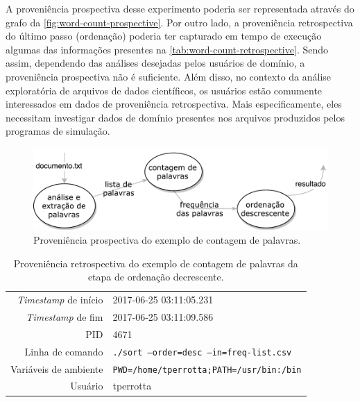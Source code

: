 A proveniência prospectiva desse experimento poderia ser representada através do grafo da \autoref{fig:word-count-prospective}. Por outro lado, a proveniência retrospectiva do último passo (ordenação) poderia ter capturado em tempo de execução algumas das informações presentes na \autoref{tab:word-count-retrospective}. Sendo assim, dependendo das análises desejadas pelos usuários de domínio, a proveniência prospectiva não é suficiente. Além disso, no contexto da análise exploratória de arquivos de dados científicos, os usuários estão comumente interessados em dados de proveniência retrospectiva. Mais especificamente, eles necessitam investigar dados de domínio presentes nos arquivos produzidos pelos programas de simulação.

\begin{figure}[htb]
    \centering
    \includegraphics[width=\textwidth]{img/word-count-prospective}
    \caption[Proveniência prospectiva do exemplo de contagem de palavras]{Proveniência prospectiva do exemplo de contagem de palavras.}%
    \label{fig:word-count-prospective}
\end{figure}

\begin{table}[htb]
    \centering
    \begin{tabular}{r|l}
        \hline
        \textit{Timestamp} de início & 2017-06-25 03:11:05.231                         \\
        \textit{Timestamp} de fim    & 2017-06-25 03:11:09.586                         \\
        PID                          & 4671                                            \\
        Linha de comando             & \texttt{./sort --order=desc --in=freq-list.csv} \\
        Variáveis de ambiente        & \texttt{PWD=/home/tperrotta;PATH=/usr/bin:/bin} \\
        Usuário                      & tperrotta                                       \\
        \hline
    \end{tabular}
    \caption[Proveniência retrospectiva do exemplo de contagem de palavras]{Proveniência retrospectiva do exemplo de contagem de palavras da etapa de ordenação decrescente.}%
    \label{tab:word-count-retrospective}
\end{table}

